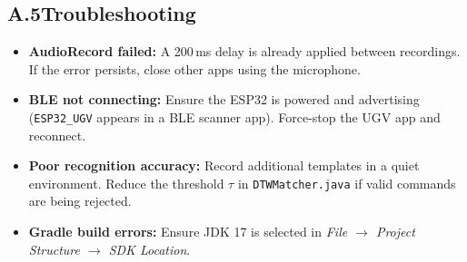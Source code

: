 \documentclass[conference]{IEEEtran}
\begin{document}
\subsection*{A.5\quad Troubleshooting}

\begin{itemize}
  \item \textbf{AudioRecord failed:} A 200\,ms delay is already applied
    between recordings. If the error persists, close other apps
    using the microphone.
  \item \textbf{BLE not connecting:} Ensure the ESP32 is powered and
    advertising (\texttt{ESP32\_UGV} appears in a BLE scanner app).
    Force-stop the UGV app and reconnect.
  \item \textbf{Poor recognition accuracy:} Record additional templates
    in a quiet environment. Reduce the threshold $\tau$ in
    \texttt{DTWMatcher.java} if valid commands are being rejected.
  \item \textbf{Gradle build errors:} Ensure JDK 17 is selected in
    \textit{File $\to$ Project Structure $\to$ SDK Location}.
\end{itemize}
\end{document}
